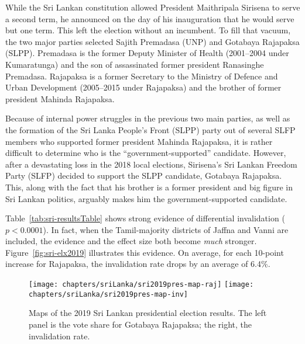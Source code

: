 While the Sri Lankan constitution allowed President Maithripala Sirisena to serve a second term, he announced on the day of his inauguration that he would serve but one term.\cite{sbs-20150110} This left the election without an incumbent. To fill that vacuum, the two major parties selected Sajith Premadasa (UNP) and Gotabaya Rajapaksa (SLPP). Premadasa is the former Deputy Minister of Health (2001--2004 under Kumaratunga) and the son of assassinated former president Ranasinghe Premadasa. Rajapaksa is a former Secretary to the Ministry of Defence and Urban Development (2005--2015 under Rajapaksa) and the brother of former president Mahinda Rajapaksa.

Because of internal power struggles in the previous two main parties, as well as the formation of the Sri Lanka People's Front (SLPP) party out of several SLFP members who supported former president Mahinda Rajapaksa, it is rather difficult to determine who is the ``government-supported'' candidate. However, after a devastating loss in the 2018 local elections, Sirisena's Sri Lankan Freedom Party (SLFP) decided to support the SLPP candidate, Gotabaya Rajapaksa.\cite{newsfirst-2019} This, along with the fact that his brother is a former president and big figure in Sri Lankan politics, arguably makes him the government-supported candidate.





Table~\ref{tab:sri-resultsTable} shows strong evidence of differential invalidation ($p < 0.0001$). In fact, when the Tamil-majority districts of Jaffna and Vanni are included, the evidence and the effect size both become \emph{much} stronger. Figure~\ref{fig:sri-elx2019} illustrates this evidence. On average, for each 10-point increase for Rajapaksa, the invalidation rate drops by an average of 6.4\%.



\begin{figure}
\begin{center}
\texttt{[image: chapters/sriLanka/sri2019pres-map-raj]}
\hfill
\texttt{[image: chapters/sriLanka/sri2019pres-map-inv]}
\end{center}
\caption[Map of 2019 Sri Lankan presidential election results.]{Maps of the 2019 Sri Lankan presidential election results. The left panel is the vote share for Gotabaya Rajapaksa; the right, the invalidation rate.}
\label{fig:sriLanka-sri2019pres}
\end{figure}


